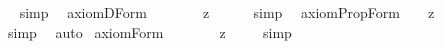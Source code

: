 \begin{isabellebody}
\isadelimproof
\ %
\endisadelimproof
%
\isatagproof
{}\isamarkupfalse%
\ {\isacharparenleft}simp{\isacharparenright}\ \isamarkupfalse%
%
\endisatagproof
{\isafoldproof}%
%
\isadelimproof
%
\endisadelimproof
\isanewline
{}\isamarkupfalse%
\ axiom{\isacharunderscore}D{\isacharunderscore}Form{\isacharcolon}\ \ \ \ \ {\isachardoublequoteopen}{\isacharbrackleft}{\isasymforall}{\isacharparenleft}{\isasymlambda}{\isasymphi}{\isachardot}\ {\isacharparenleft}{\isasymbox}\ {\isacharsemicolon}{\isasymphi}{\isacharsemicolon}{\isacharparenright}\ {\isasymrightarrow}\isactrlsup z\ {\isacharparenleft}{\isasymbox}\ {\isacharparenleft}{\isasymbox}\ {\isacharsemicolon}{\isasymphi}{\isacharsemicolon}{\isacharparenright}{\isacharparenright}{\isacharparenright}{\isacharbrackright}{\isachardoublequoteclose}%
\isadelimproof
\ %
\endisadelimproof
%
\isatagproof
{}\isamarkupfalse%
\ {\isacharparenleft}simp{\isacharparenright}\ \isamarkupfalse%
%
\endisatagproof
{\isafoldproof}%
%
\isadelimproof
%
\endisadelimproof
\isanewline
\isanewline
{}\isamarkupfalse%
\ axiom{\isacharunderscore}{}{\isacharunderscore}PropForm{\isacharcolon}\ {\isachardoublequoteopen}{\isacharbrackleft}{\isasymforall}{\isacharparenleft}{\isasymlambda}{\isasymphi}{\isachardot}\ {\isacharparenleft}{\isasymbox}\ {\isacharcomma}{\isasymphi}{\isacharcomma}{\isacharparenright}\ {\isasymrightarrow}\isactrlsup z\ {\isacharparenleft}{\isasymdiamond}\ {\isacharcomma}{\isasymphi}{\isacharcomma}{\isacharparenright}{\isacharparenright}{\isacharbrackright}{\isachardoublequoteclose}%
\isadelimproof
\ %
\endisadelimproof
%
\isatagproof
{}\isamarkupfalse%
\ {\isacharparenleft}simp{\isacharparenright}\ \isamarkupfalse%
\ auto%
\endisatagproof
{\isafoldproof}%
%
\isadelimproof
%
\endisadelimproof
\isanewline
{}\isamarkupfalse%
\ axiom{\isacharunderscore}{}{\isacharunderscore}Form{\isacharcolon}\ \ \ \ \ {\isachardoublequoteopen}{\isacharbrackleft}{\isasymforall}{\isacharparenleft}{\isasymlambda}{\isasymphi}{\isachardot}\ {\isacharparenleft}{\isasymbox}\ {\isacharsemicolon}{\isasymphi}{\isacharsemicolon}{\isacharparenright}\ {\isasymrightarrow}\isactrlsup z\ {\isacharparenleft}{\isasymdiamond}\ {\isacharsemicolon}{\isasymphi}{\isacharsemicolon}{\isacharparenright}{\isacharparenright}{\isacharbrackright}{\isachardoublequoteclose}%
\isadelimproof
\ %
\endisadelimproof
%
\isatagproof
{}\isamarkupfalse%
\ {\isacharparenleft}simp{\isacharparenright}\ \isamarkupfalse%

\end{isabellebody}
